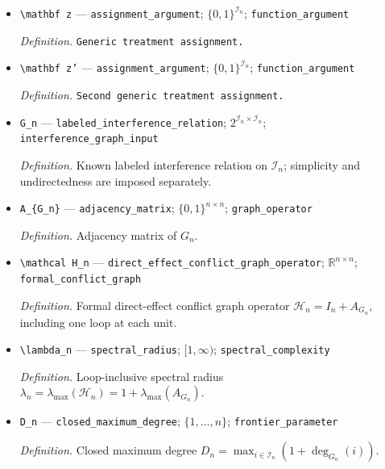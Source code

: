 \documentclass{article}
\begin{document}
\begin{itemize}
  \item \texttt{\textbackslash{}\allowbreak{}mathbf z} --- \texttt{assignment\_\allowbreak{}argument}; \(\{0,1\}^{\mathcal I_n}\); \texttt{function\_\allowbreak{}argument}
  \par\smallskip\noindent\emph{Definition.} \texttt{Generic treatment assignment.}
  \item \texttt{\textbackslash{}\allowbreak{}mathbf z'} --- \texttt{assignment\_\allowbreak{}argument}; \(\{0,1\}^{\mathcal I_n}\); \texttt{function\_\allowbreak{}argument}
  \par\smallskip\noindent\emph{Definition.} \texttt{Second generic treatment assignment.}
  \item \texttt{G\_\allowbreak{}n} --- \texttt{labeled\_\allowbreak{}interference\_\allowbreak{}relation}; \(2^{\mathcal I_n\times\mathcal I_n}\); \texttt{interference\_\allowbreak{}graph\_\allowbreak{}input}
  \par\smallskip\noindent\emph{Definition.} Known labeled interference relation on \(\mathcal I_n\); simplicity and undirectedness are imposed separately.
  \item \texttt{A\_\allowbreak{}\{G\_\allowbreak{}n\}\allowbreak{}} --- \texttt{adjacency\_\allowbreak{}matrix}; \(\{0,1\}^{n\times n}\); \texttt{graph\_\allowbreak{}operator}
  \par\smallskip\noindent\emph{Definition.} Adjacency matrix of \(G_n\).
  \item \texttt{\textbackslash{}\allowbreak{}mathcal H\_\allowbreak{}n} --- \texttt{direct\_\allowbreak{}effect\_\allowbreak{}conflict\_\allowbreak{}graph\_\allowbreak{}operator}; \(\mathbb R^{n\times n}\); \texttt{formal\_\allowbreak{}conflict\_\allowbreak{}graph}
  \par\smallskip\noindent\emph{Definition.} Formal direct-effect conflict graph operator \(\mathcal H_n=I_n+A_{G_n}\), including one loop at each unit.
  \item \texttt{\textbackslash{}\allowbreak{}lambda\_\allowbreak{}n} --- \texttt{spectral\_\allowbreak{}radius}; \([1,\infty)\); \texttt{spectral\_\allowbreak{}complexity}
  \par\smallskip\noindent\emph{Definition.} Loop-inclusive spectral radius \(\lambda_n=\lambda_{\max}(\mathcal H_n)=1+\lambda_{\max}(A_{G_n})\).
  \item \texttt{D\_\allowbreak{}n} --- \texttt{closed\_\allowbreak{}maximum\_\allowbreak{}degree}; \(\{1,\ldots,n\}\); \texttt{frontier\_\allowbreak{}parameter}
  \par\smallskip\noindent\emph{Definition.} Closed maximum degree \(D_n=\max_{i\in\mathcal I_n}(1+\deg_{G_n}(i))\).

\end{itemize}
\end{document}
